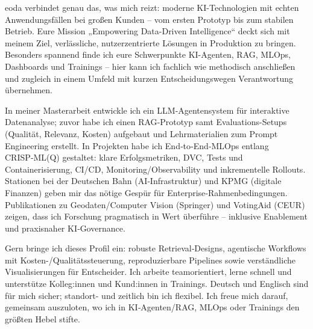 eoda verbindet genau das, was mich reizt: moderne KI-Technologien mit echten Anwendungsfällen bei großen Kunden – vom ersten Prototyp bis zum stabilen Betrieb. Eure Mission „Empowering Data-Driven Intelligence“ deckt sich mit meinem Ziel, verlässliche, nutzerzentrierte Lösungen in Produktion zu bringen. Besonders spannend finde ich eure Schwerpunkte KI-Agenten, RAG, MLOps, Dashboards und Trainings – hier kann ich fachlich wie methodisch anschließen und zugleich in einem Umfeld mit kurzen Entscheidungswegen Verantwortung übernehmen.

In meiner Masterarbeit entwickle ich ein LLM‑Agentensystem für interaktive Datenanalyse; zuvor habe ich einen RAG‑Prototyp samt Evaluations-Setups (Qualität, Relevanz, Kosten) aufgebaut und Lehrmaterialien zum Prompt Engineering erstellt. In Projekten habe ich End‑to‑End‑MLOps entlang CRISP‑ML(Q) gestaltet: klare Erfolgsmetriken, DVC, Tests und Containerisierung, CI/CD, Monitoring/Observability und inkrementelle Rollouts. Stationen bei der Deutschen Bahn (AI‑Infrastruktur) und KPMG (digitale Finanzen) geben mir das nötige Gespür für Enterprise‑Rahmenbedingungen. Publikationen zu Geodaten/Computer Vision (Springer) und VotingAid (CEUR) zeigen, dass ich Forschung pragmatisch in Wert überführe – inklusive Enablement und praxisnaher KI‑Governance.

Gern bringe ich dieses Profil ein: robuste Retrieval‑Designs, agentische Workflows mit Kosten-/Qualitätssteuerung, reproduzierbare Pipelines sowie verständliche Visualisierungen für Entscheider. Ich arbeite teamorientiert, lerne schnell und unterstütze Kolleg:innen und Kund:innen in Trainings. Deutsch und Englisch sind für mich sicher; standort- und zeitlich bin ich flexibel. Ich freue mich darauf, gemeinsam auszuloten, wo ich in KI‑Agenten/RAG, MLOps oder Trainings den größten Hebel stifte.